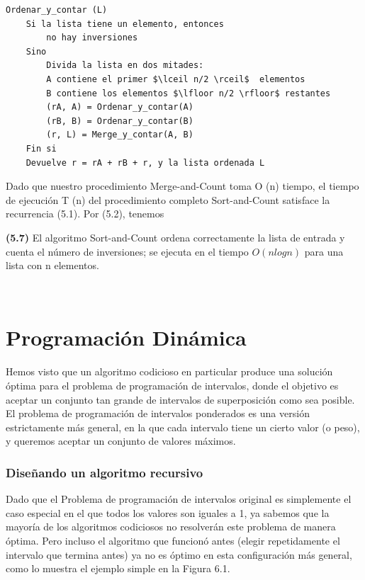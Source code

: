 \documentclass[a4paper, 12pt]{book}
\begin{document}
\begin{lstlisting}
Ordenar_y_contar (L)
    Si la lista tiene un elemento, entonces
        no hay inversiones
    Sino
        Divida la lista en dos mitades:
        A contiene el primer $\lceil n/2 \rceil$  elementos
        B contiene los elementos $\lfloor n/2 \rfloor$ restantes
        (rA, A) = Ordenar_y_contar(A)
        (rB, B) = Ordenar_y_contar(B)
        (r, L) = Merge_y_contar(A, B)
    Fin si
    Devuelve r = rA + rB + r, y la lista ordenada L
\end{lstlisting}

Dado que nuestro procedimiento Merge-and-Count toma O (n) tiempo, el tiempo de ejecución T (n) del procedimiento completo Sort-and-Count satisface la recurrencia (5.1). Por (5.2), tenemos\\


\colorbox{mygray}{\parbox{15cm}{
\textbf{(5.7)} El algoritmo Sort-and-Count ordena correctamente la lista de entrada y cuenta el número de inversiones; se ejecuta en el tiempo $O (n log n)$ para una lista con n elementos.}}\\

\newpage

\chapter{Programación Dinámica}

Hemos visto que un algoritmo codicioso en particular produce una solución óptima para el problema de programación de intervalos, donde el objetivo es aceptar un conjunto tan grande de intervalos de superposición como sea posible. El problema de programación de intervalos ponderados es una versión estrictamente más general, en la que cada intervalo tiene un cierto valor (o peso), y queremos aceptar un conjunto de valores máximos.\\

\subsection{Diseñando un algoritmo recursivo}

Dado que el Problema de programación de intervalos original es simplemente el caso especial en el que todos los valores son iguales a 1, ya sabemos que la mayoría de los algoritmos codiciosos no resolverán este problema de manera óptima. Pero incluso el algoritmo que funcionó antes (elegir repetidamente el intervalo que termina antes) ya no es óptimo en esta configuración más general, como lo muestra el ejemplo simple en la Figura 6.1.\\
\end{document}
